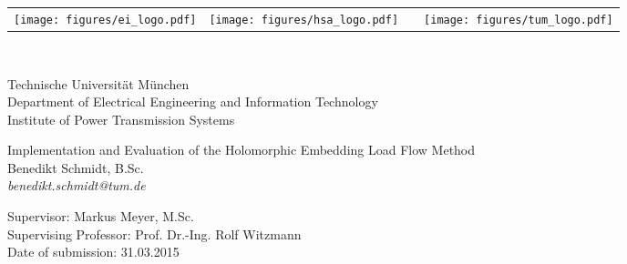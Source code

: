 \begin{titlepage}
	
	\begin{flushleft}
		\begin{tabularx}{\linewidth}{@{}llXr@{}}
			\texttt{[image: figures/ei\_logo.pdf]} &	
			\texttt{[image: figures/hsa\_logo.pdf]} & 
			& 
			\texttt{[image: figures/tum\_logo.pdf]}
		\end{tabularx}
	\end{flushleft}
	\hfill \\[1cm]
	
	\begin{flushleft}
		Technische Universität München \\
		Department of Electrical Engineering and Information Technology \\
		Institute of Power Transmission Systems \\[4cm]
	\end{flushleft}
		
	\begin{center}
		\huge
		Implementation and Evaluation of the Holomorphic Embedding Load Flow Method\\[1cm]
		\large
		Benedikt Schmidt, B.Sc. \\
		\textit{benedikt.schmidt@tum.de} \\[7cm]
	\end{center}
	
	\begin{flushleft}
		Supervisor: Markus Meyer, M.Sc. \\
		Supervising Professor: Prof. Dr.-Ing. Rolf Witzmann \\
		Date of submission: 31.03.2015
	\end{flushleft}
\end{titlepage}